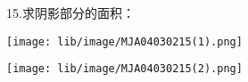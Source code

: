 15.求阴影部分的面积：

\begin{center}

    \texttt{[image: lib/image/MJA04030215(1).png]}\qquad\qquad\qquad

    \texttt{[image: lib/image/MJA04030215(2).png]}

\end{center}



